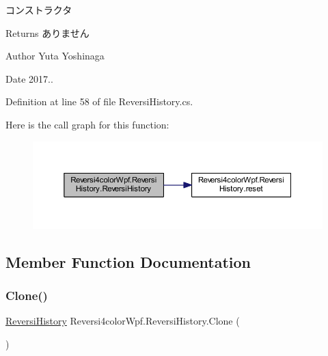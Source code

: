 コンストラクタ 

\begin{DoxyReturn}{Returns}
ありません 
\end{DoxyReturn}
\begin{DoxyAuthor}{Author}
Yuta Yoshinaga 
\end{DoxyAuthor}
\begin{DoxyDate}{Date}
2017.. 
\end{DoxyDate}


Definition at line 58 of file Reversi\+History.\+cs.

Here is the call graph for this function\+:
\nopagebreak
\begin{figure}[H]
\begin{center}
\leavevmode
\includegraphics[width=350pt]{class_reversi4color_wpf_1_1_reversi_history_a520d9daed923934bb9042cd0bcaafeb5_cgraph}
\end{center}
\end{figure}


\subsection{Member Function Documentation}
\mbox{\label{class_reversi4color_wpf_1_1_reversi_history_abf1b22f4ba061084d84119c52f8a968a}} 
\subsubsection{\texorpdfstring{Clone()}{Clone()}}
{\footnotesize\ttfamily \hyperlink{class_reversi4color_wpf_1_1_reversi_history}{Reversi\+History} Reversi4color\+Wpf.\+Reversi\+History.\+Clone (\begin{DoxyParamCaption}{ }\end{DoxyParamCaption})}



